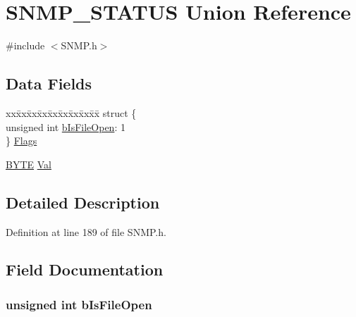 \hypertarget{union_s_n_m_p___s_t_a_t_u_s}{}\section{S\+N\+M\+P\+\_\+\+S\+T\+A\+T\+U\+S Union Reference}
\label{union_s_n_m_p___s_t_a_t_u_s}


{\ttfamily \#include $<$S\+N\+M\+P.\+h$>$}

\subsection*{Data Fields}
\begin{DoxyCompactItemize}
\item 
\begin{tabbing}
xx\=xx\=xx\=xx\=xx\=xx\=xx\=xx\=xx\=\kill
struct \{\\
\>unsigned int \hyperlink{union_s_n_m_p___s_t_a_t_u_s_a4b028a01a1a57aa6fbd192d4f4afd21e}{bIsFileOpen}: 1\\
\} \hyperlink{union_s_n_m_p___s_t_a_t_u_s_a3b55867bf6f020d45aa147b899f1f3a1}{Flags}\\

\end{tabbing}\item 
\hyperlink{_generic_type_defs_8h_a4ae1dab0fb4b072a66584546209e7d58}{B\+Y\+T\+E} \hyperlink{union_s_n_m_p___s_t_a_t_u_s_a5ab8c2bf45b20b5f7aa3a4f083896cec}{Val}
\end{DoxyCompactItemize}


\subsection{Detailed Description}


Definition at line 189 of file S\+N\+M\+P.\+h.



\subsection{Field Documentation}
\hypertarget{union_s_n_m_p___s_t_a_t_u_s_a4b028a01a1a57aa6fbd192d4f4afd21e}{}
\subsubsection[{b\+Is\+File\+Open}]{\setlength{\rightskip}{0pt plus 5cm}unsigned int b\+Is\+File\+Open}\label{union_s_n_m_p___s_t_a_t_u_s_a4b028a01a1a57aa6fbd192d4f4afd21e}


